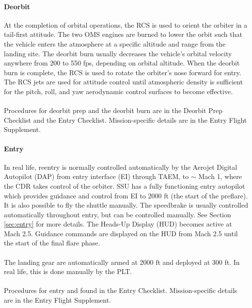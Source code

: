 \documentclass[13pt]{article}
\begin{document}
\begin{multicols*}{2}
\paragraph{Deorbit}
At the completion of orbital operations, the RCS is used to orient the orbiter in a tail-first attitude. The two OMS engines are burned to lower the orbit such that the vehicle enters the atmosphere at a specific altitude and range from the landing site. The deorbit burn usually decreases the vehicle's orbital velocity anywhere from 200 to 550 fps, depending on orbital altitude.  When the deorbit burn is complete, the RCS is used to rotate the orbiter's nose forward for entry. The RCS jets are used for attitude control until atmospheric density is sufficient for the pitch, roll, and yaw aerodynamic control surfaces to become effective. \\
\\
Procedures for deorbit prep and the deorbit burn are in the Deorbit Prep Checklist and the Entry Checklist. Mission-specific details are in the Entry Flight Supplement.
\paragraph{Entry}
In real life, reentry is normally controlled automatically by the Aerojet Digital Autopilot (DAP) from entry interface (EI) through TAEM, to $\sim$ Mach 1, where the CDR takes control of the orbiter. SSU has a fully functioning entry autopilot which provides guidance and control from EI to 2000 ft (the start of the preflare). It is also possible to fly the shuttle manually. The speedbrake is usually controlled automatically throughout entry, but can be controlled manually. See Section \ref{sec:entry} for more details.
The Heads-Up Display (HUD) becomes active at Mach 2.5. Guidance commands are displayed on the HUD from Mach 2.5 until the start of the final flare phase. \\
\\
The landing gear are automatically armed at 2000 ft and deployed at 300 ft. In real life, this is done manually by the PLT. \\
\\
Procedures for entry and found in the Entry Checklist. Mission-specific details are in the Entry Flight Supplement.
\vfill

\end{multicols*}
\end{document}
